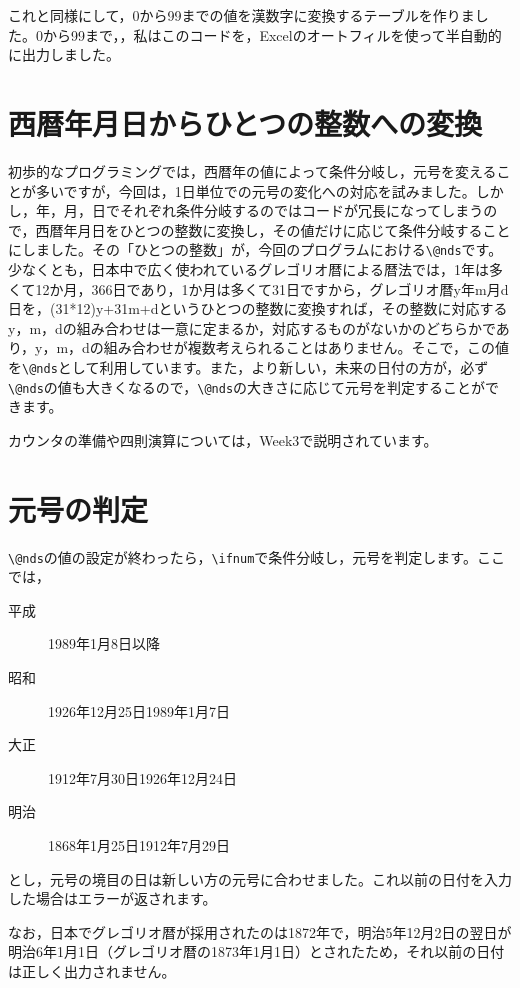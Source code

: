 \documentclass[autodetect-engine,dvipdfmx]{jsarticle}
\begin{document}
これと同様にして，0から99までの値を漢数字に変換するテーブルを作りました。0から99まで，\verb@{}，私はこのコードを，Excelのオートフィルを使って半自動的に出力しました。

\section{西暦年月日からひとつの整数への変換}

初歩的なプログラミングでは，西暦年の値によって条件分岐し，元号を変えることが多いですが，今回は，1日単位での元号の変化への対応を試みました。しかし，年，月，日でそれぞれ条件分岐するのではコードが冗長になってしまうので，西暦年月日をひとつの整数に変換し，その値だけに応じて条件分岐することにしました。その「ひとつの整数」が，今回のプログラムにおける\verb|\@nds|です。少なくとも，日本中で広く使われているグレゴリオ暦による暦法では，1年は多くて12か月，366日であり，1か月は多くて31日ですから，グレゴリオ暦y年m月d日を，(31*12)y+31m+dというひとつの整数に変換すれば，その整数に対応するy，m，dの組み合わせは一意に定まるか，対応するものがないかのどちらかであり，y，m，dの組み合わせが複数考えられることはありません。そこで，この値を\verb|\@nds|として利用しています。また，より新しい，未来の日付の方が，必ず\verb|\@nds|の値も大きくなるので，\verb|\@nds|の大きさに応じて元号を判定することができます。

カウンタの準備や四則演算については，Week3で説明されています。

\section{元号の判定}

\verb|\@nds|の値の設定が終わったら，\verb|\ifnum|で条件分岐し，元号を判定します。ここでは，

\begin{description}
\item[平成]1989年1月8日以降
\item[昭和]1926年12月25日1989年1月7日
\item[大正]1912年7月30日1926年12月24日
\item[明治]1868年1月25日1912年7月29日
\end{description}

とし，元号の境目の日は新しい方の元号に合わせました。これ以前の日付を入力した場合はエラーが返されます。

なお，日本でグレゴリオ暦が採用されたのは1872年で，明治5年12月2日の翌日が明治6年1月1日（グレゴリオ暦の1873年1月1日）とされたため，それ以前の日付は正しく出力されません。
\end{document}
